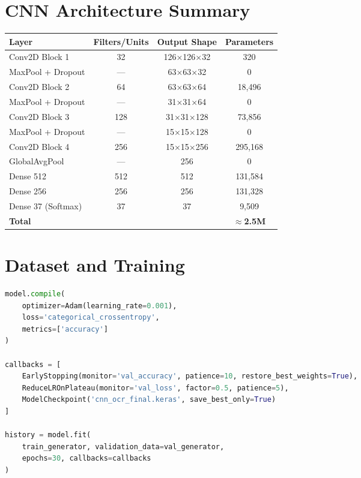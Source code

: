 \documentclass[12pt,a4paper]{report}
\begin{document}
\section{CNN Architecture Summary}

\begin{center}
\begin{tabular}{|l|c|c|c|}
\hline
\textbf{Layer} & \textbf{Filters/Units} & \textbf{Output Shape} & \textbf{Parameters} \\
\hline
Conv2D Block 1 & 32 & 126×126×32 & 320 \\
\hline
MaxPool + Dropout & — & 63×63×32 & 0 \\
\hline
Conv2D Block 2 & 64 & 63×63×64 & 18,496 \\
\hline
MaxPool + Dropout & — & 31×31×64 & 0 \\
\hline
Conv2D Block 3 & 128 & 31×31×128 & 73,856 \\
\hline
MaxPool + Dropout & — & 15×15×128 & 0 \\
\hline
Conv2D Block 4 & 256 & 15×15×256 & 295,168 \\
\hline
GlobalAvgPool & — & 256 & 0 \\
\hline
Dense 512 & 512 & 512 & 131,584 \\
\hline
Dense 256 & 256 & 256 & 131,328 \\
\hline
Dense 37 (Softmax) & 37 & 37 & 9,509 \\
\hline
\textbf{Total} & & & \textbf{$\approx$2.5M} \\
\hline
\end{tabular}
\end{center}

\section{Dataset and Training}

\begin{lstlisting}[language=Python, caption={CNN Training Configuration}]
model.compile(
    optimizer=Adam(learning_rate=0.001),
    loss='categorical_crossentropy',
    metrics=['accuracy']
)

callbacks = [
    EarlyStopping(monitor='val_accuracy', patience=10, restore_best_weights=True),
    ReduceLROnPlateau(monitor='val_loss', factor=0.5, patience=5),
    ModelCheckpoint('cnn_ocr_final.keras', save_best_only=True)
]

history = model.fit(
    train_generator, validation_data=val_generator,
    epochs=30, callbacks=callbacks
)
\end{lstlisting}
\end{document}
